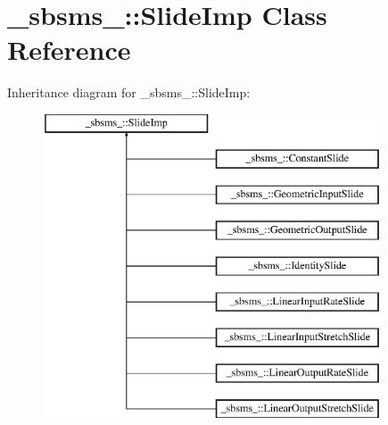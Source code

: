 \hypertarget{class__sbsms___1_1_slide_imp}{}\section{\+\_\+sbsms\+\_\+\+:\+:Slide\+Imp Class Reference}
\label{class__sbsms___1_1_slide_imp}
Inheritance diagram for \+\_\+sbsms\+\_\+\+:\+:Slide\+Imp\+:\begin{figure}[H]
\begin{center}
\leavevmode
\includegraphics[height=9.000000cm]{class__sbsms___1_1_slide_imp}
\end{center}
\end{figure}
